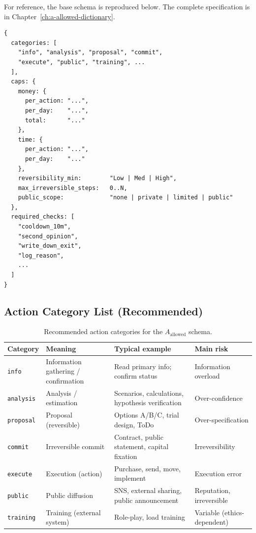 For reference, the base schema is reproduced below. The complete
specification is in Chapter~\ref{ch:a-allowed-dictionary}.

\begin{lstlisting}[basicstyle=\ttfamily\scriptsize,frame=single]
{
  categories: [
    "info", "analysis", "proposal", "commit",
    "execute", "public", "training", ...
  ],
  caps: {
    money: {
      per_action: "...",
      per_day:    "...",
      total:      "..."
    },
    time: {
      per_action: "...",
      per_day:    "..."
    },
    reversibility_min:        "Low | Med | High",
    max_irreversible_steps:   0..N,
    public_scope:             "none | private | limited | public"
  },
  required_checks: [
    "cooldown_10m",
    "second_opinion",
    "write_down_exit",
    "log_reason",
    ...
  ]
}
\end{lstlisting}

\subsection{Action Category List (Recommended)}
\label{sec:a-allowed-recommended-categories-c2}

\begin{table}[ht]
\centering
\small
\begin{tabularx}{\linewidth}{lXXX}
\toprule
\textbf{Category} & \textbf{Meaning} & \textbf{Typical example} & \textbf{Main risk} \\
\midrule
\texttt{info} & Information gathering / confirmation
& Read primary info; confirm status & Information overload \\

\texttt{analysis} & Analysis / estimation
& Scenarios, calculations, hypothesis verification &
Over-confidence \\

\texttt{proposal} & Proposal (reversible)
& Options A/B/C, trial design, ToDo &
Over-specification \\

\texttt{commit} & Irreversible commit
& Contract, public statement, capital fixation &
Irreversibility \\

\texttt{execute} & Execution (action)
& Purchase, send, move, implement &
Execution error \\

\texttt{public} & Public diffusion
& SNS, external sharing, public announcement &
Reputation, irreversible \\

\texttt{training} & Training (external system)
& Role-play, load training &
Variable (ethics-dependent) \\
\bottomrule
\end{tabularx}
\caption[Action category recommended list]{Recommended action
categories for the $A_{\mathrm{allowed}}$ schema.}
\label{tab:a-allowed-categories-c2}
\end{table}

